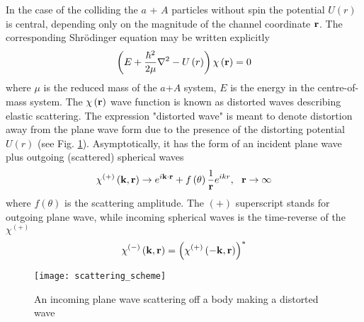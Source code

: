 \documentclass[
12pt, %
oneside, %
english, %
onehalfspacing, %
onehalfspacing, %
headsepline, %
]{MastersDoctoralThesis} %
\begin{document}
In the case of the colliding the  $a$ + $A$  particles without spin the potential $U\left( r \right)$ is central, depending only on the magnitude of the channel coordinate ${\bf r}$.
The corresponding Shr\"{o}dinger equation may be written explicitly
\begin{equation}
\left( E + \frac{\hbar^2}{2 \mu} {\bf \nabla}^2 - U \left( r \right) \right) 
\chi \left( {\bf r} \right) =0 
\label{es_she1}
\end{equation}
where $\mu$ is the reduced mass of the $a$+$A$ system, $E$ is the energy in the centre-of-mass system.
The $\chi \left( {\bf r} \right)$ wave function is known as distorted waves describing elastic scattering. The expression "distorted wave" is meant to denote distortion away from the plane wave form due to the presence   of the distorting potential $U \left( r \right)$ (see Fig. \ref{fig:scattering_scheme}). Asymptotically, it has the form of an incident plane wave plus outgoing (scattered) spherical waves
\begin{equation}
\chi^{(+)} \left( {\bf k}, {\bf r} \right) \rightarrow
e^{i {\bf k} \cdot {\bf r}} + f \left( \theta \right) \frac{1}{{\bf r}}
e^{i k r}, ~~  {\bf r} \rightarrow \infty
\label{es_chi_assymp_with_f}
\end{equation}
where $f \left( \theta \right)$ is the scattering amplitude. The $(+)$ superscript stands for outgoing plane wave, while incoming spherical waves is the time-reverse of the $\chi^{(+)}$
\begin{equation}
\chi^{(-)} \left( {\bf k}, {\bf r} \right) = 
\left( \chi^{(+)} \left(- {\bf k}, {\bf r} \right) \right)^{*}
\end{equation}


\begin{figure}
\centering
\texttt{[image: scattering\_scheme]}
\decoRule
\caption{ \footnotesize An incoming plane wave scattering off a body making a distorted wave}
\label{fig:scattering_scheme}
\end{figure}
\end{document}
